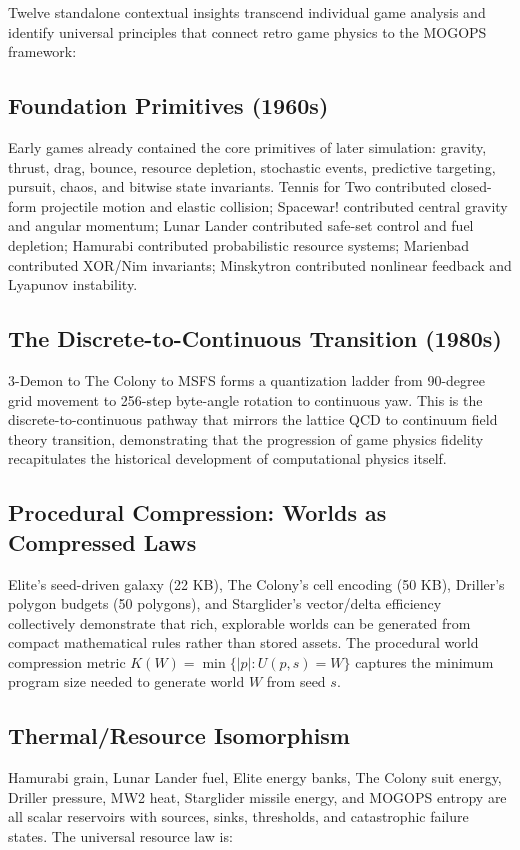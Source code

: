 \documentclass[11pt,a4paper]{article}
\theoremstyle{definition}
\begin{document}
Twelve standalone contextual insights transcend individual game analysis and identify universal principles that connect retro game physics to the MOGOPS framework:

\subsection{Foundation Primitives (1960s)}
Early games already contained the core primitives of later simulation: gravity, thrust, drag, bounce, resource depletion, stochastic events, predictive targeting, pursuit, chaos, and bitwise state invariants. Tennis for Two contributed closed-form projectile motion and elastic collision; Spacewar! contributed central gravity and angular momentum; Lunar Lander contributed safe-set control and fuel depletion; Hamurabi contributed probabilistic resource systems; Marienbad contributed XOR/Nim invariants; Minskytron contributed nonlinear feedback and Lyapunov instability.

\subsection{The Discrete-to-Continuous Transition (1980s)}
3-Demon to The Colony to MSFS forms a quantization ladder from 90-degree grid movement to 256-step byte-angle rotation to continuous yaw. This is the discrete-to-continuous pathway that mirrors the lattice QCD to continuum field theory transition, demonstrating that the progression of game physics fidelity recapitulates the historical development of computational physics itself.

\subsection{Procedural Compression: Worlds as Compressed Laws}
Elite's seed-driven galaxy (22 KB), The Colony's cell encoding (50 KB), Driller's polygon budgets (50 polygons), and Starglider's vector/delta efficiency collectively demonstrate that rich, explorable worlds can be generated from compact mathematical rules rather than stored assets. The procedural world compression metric $K(W) = \min\{|p|: U(p,s)=W\}$ captures the minimum program size needed to generate world $W$ from seed $s$.

\subsection{Thermal/Resource Isomorphism}
Hamurabi grain, Lunar Lander fuel, Elite energy banks, The Colony suit energy, Driller pressure, MW2 heat, Starglider missile energy, and MOGOPS entropy are all scalar reservoirs with sources, sinks, thresholds, and catastrophic failure states. The universal resource law is:
\end{document}
